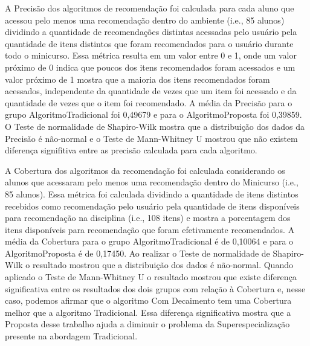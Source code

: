 A Precisão dos algoritmos de recomendação foi calculada para cada aluno que acessou pelo menos uma recomendação dentro do
ambiente (i.e., 85 alunos) dividindo a quantidade de recomendações distintas acessadas pelo usuário pela quantidade de
itens distintos que foram recomendados para o usuário durante todo o minicurso. Essa métrica resulta em um valor entre
0 e 1, onde um valor próximo de 0 indica que poucos dos itens recomendados foram acessados e um valor próximo de 1
mostra que a maioria dos itens recomendados foram acessados, independente da quantidade de vezes que um item foi
acessado e da quantidade de vezes que o item foi recomendado. A média da Precisão para o grupo AlgoritmoTradicional foi
0,49679 e para o AlgoritmoProposta foi 0,39859. O Teste de normalidade de Shapiro-Wilk mostra que a distribuição dos
dados da Precisão é não-normal e o Teste de Mann-Whitney U mostrou que não existem diferença signifitiva entre as
precisão calculada para cada algoritmo.

A Cobertura dos algoritmos da recomendação foi calculada considerando os alunos que acessaram pelo menos uma recomendação
dentro do Minicurso (i.e., 85 alunos). Essa métrica foi calculada dividindo a quantidade de itens distintos recebidos
como recomendação pelo usuário pela quantidade de itens disponíveis para recomendação na disciplina (i.e., 108 itens) e mostra
a porcentagem dos itens disponíveis para recomendação que foram efetivamente recomendados. A média da Cobertura para o
grupo AlgoritmoTradicional é de 0,10064 e para o AlgoritmoProposta é de 0,17450. Ao realizar o Teste de
normalidade de Shapiro-Wilk o resultado mostrou que a distribuição dos dados é não-normal. Quando aplicado o Teste de Mann-Whitney
U o resultado mostrou que existe diferença significativa entre os resultados dos dois grupos com relação à Cobertura e, nesse caso,
podemos afirmar que o algoritmo Com Decaimento tem uma Cobertura melhor que a algoritmo Tradicional. Essa diferença significativa
mostra que a Proposta desse trabalho ajuda a diminuir o problema da Superespecialização presente na abordagem Tradicional.

